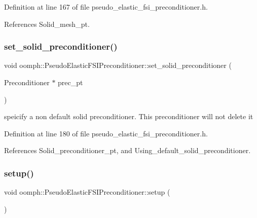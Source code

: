 Definition at line 167 of file pseudo\+\_\+elastic\+\_\+fsi\+\_\+preconditioner.\+h.



References Solid\+\_\+mesh\+\_\+pt.

\mbox{\label{classoomph_1_1PseudoElasticFSIPreconditioner_a92e59f83606d77e7407a4ace534546f2}} 
\subsubsection{\texorpdfstring{set\+\_\+solid\+\_\+preconditioner()}{set\_solid\_preconditioner()}}
{\footnotesize\ttfamily void oomph\+::\+Pseudo\+Elastic\+F\+S\+I\+Preconditioner\+::set\+\_\+solid\+\_\+preconditioner (\begin{DoxyParamCaption}\item[{Preconditioner $\ast$}]{prec\+\_\+pt }\end{DoxyParamCaption})\hspace{0.3cm}{\ttfamily [inline]}}



speicify a non default solid preconditioner. This preconditioner will not delete it 



Definition at line 180 of file pseudo\+\_\+elastic\+\_\+fsi\+\_\+preconditioner.\+h.



References Solid\+\_\+preconditioner\+\_\+pt, and Using\+\_\+default\+\_\+solid\+\_\+preconditioner.

\mbox{\label{classoomph_1_1PseudoElasticFSIPreconditioner_a460ad5eea59f4c07dfde8b11696fabb1}} 
\subsubsection{\texorpdfstring{setup()}{setup()}}
{\footnotesize\ttfamily void oomph\+::\+Pseudo\+Elastic\+F\+S\+I\+Preconditioner\+::setup (\begin{DoxyParamCaption}{ }\end{DoxyParamCaption})}



